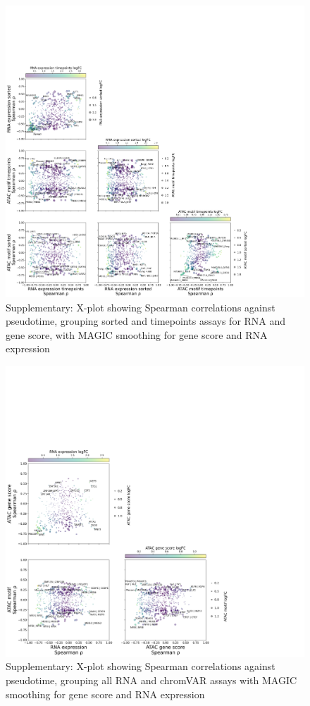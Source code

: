 \documentclass[a4paper]{article}
\begin{document}
\begin{figure}[!htb]
  \centering
  \includegraphics[width=\textwidth]{../figures/hematopoiesis/Basophil_40_109_smooth_magic_semi_detailed_X_plot.png}
  \caption{Supplementary: X-plot showing Spearman correlations against pseudotime, grouping sorted and timepoints assays for RNA and gene score, with MAGIC smoothing for gene score and RNA expression}
\end{figure}

\begin{figure}[!htb]
  \centering
  \includegraphics[width=\textwidth]{../figures/hematopoiesis/Basophil_40_109_smooth_magic_grouped_X_plot.png}
  \caption{Supplementary: X-plot showing Spearman correlations against pseudotime, grouping all RNA and chromVAR assays with MAGIC smoothing for gene score and RNA expression}
\end{figure}
\end{document}
